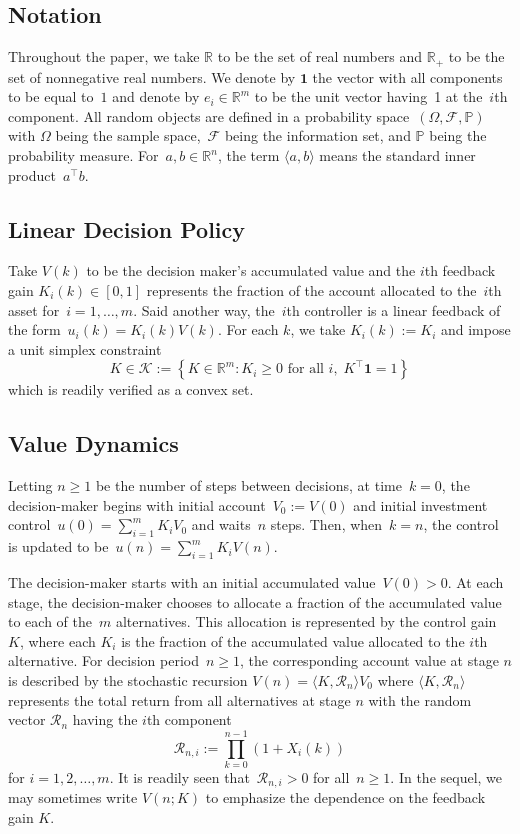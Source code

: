 \subsection{Notation}
    Throughout the paper, we take $\mathbb{R}$ to be the set of real numbers and $\mathbb{R}_{+}$ to be the set of nonnegative real numbers.
    We denote by $\textbf{1}$ the vector with all components to be equal to~$1$ and denote by $ e_i \in \mathbb{R}^m $ to be the unit vector having~1 at the~$i$th component.
    All random objects are defined in a probability space~$(\Omega, \mathcal{F}, \mathbb{P})$ with $\Omega$ being the sample space,~$\mathcal{F}$ being the information set, and $\mathbb{P}$ being the probability measure. 
    For~$a,b \in \mathbb{R}^n$, the term $\langle a, b \rangle$ means the standard inner product~$a^\top b$.



\subsection{Linear Decision Policy}
Take $V(k)$ to be the decision maker's accumulated value and the $i$th feedback gain 
	$
    K_i(k) \in [0, 1]
	$
represents the fraction of the account allocated to the~$i$th asset for~$i=1,\dots,m$. 
Said another way,  the~$i$th controller is  a linear feedback of the form~$
	u_i(k) = K_i(k) V(k).
	$
For each $k$, we take $K_i(k) := K_i$ and impose a unit simplex constraint
	$$
	K \in {\mathcal K} := \left\{K \in \mathbb{R}^{m}: K_i \geq 0 \text{ for all $i$}, \; K^\top \textbf{1} = 1 \right\}
	$$
 which is readily verified as a convex set. 




\subsection{Value Dynamics} 
    Letting $n \geq 1$ be the number of steps between decisions,  at time~{$k=0$}, the decision-maker begins with initial account~$V_0 := V(0)$ and initial investment control~{$
	u(0) = \sum_{i=1}^m K_i V_0
	$}
	and waits~$n$ steps. Then, when~{$k=n$}, the control is updated to be~$
		u(n) = \sum_{i=1}^m K_i V(n).
		$
	

The decision-maker starts with an initial accumulated value~$V(0)>0$. At each stage, the decision-maker chooses to allocate a fraction of the accumulated value to each of the~$m$ alternatives. This allocation is represented by the control gain~$K$, where each $K_i$ is the fraction of the accumulated value allocated to the $i$th alternative.
For decision period~$n \geq 1$, the corresponding account value at stage $n$ is described by the stochastic recursion
	$
	V(n) =  \langle K, \mathcal{R}_n \rangle V_0 
	$
where $\langle K, \mathcal{R}_n \rangle$ represents the total return from all alternatives at stage $n$ with the random vector $\mathcal{R}_n$ having the $i$th component 
	$$
	\mathcal{R}_{n,i} := \prod_{k=0}^{n-1} (1+X_i(k)) 
	$$
 for $i=1,2, \ldots, m$.
It is readily seen that~{$\mathcal{R}_{n,i} > 0$} for all~$n \geq 1$.
In the sequel, we may sometimes write $V(n; K)$ to emphasize the dependence on the feedback gain $K$. 


